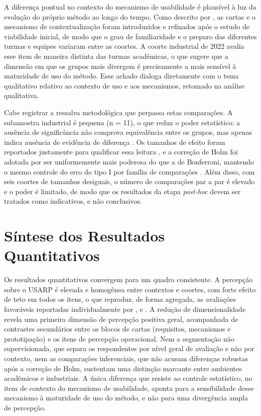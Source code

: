 \FloatBarrier

A diferença pontual no contexto do mecanismo de usabilidade é plausível à luz da evolução do próprio método ao longo do tempo. Como descrito por , as cartas e o mecanismo de contextualização foram introduzidos e refinados após o estudo de viabilidade inicial, de modo que o grau de familiaridade e o preparo das diferentes turmas e equipes variaram entre as coortes. A coorte industrial de 2022 avalia esse item de maneira distinta das turmas acadêmicas, o que sugere que a dimensão em que os grupos mais divergem é precisamente a mais sensível à maturidade de uso do método. Esse achado dialoga diretamente com o tema qualitativo relativo ao contexto de uso e aos mecanismos, retomado na análise qualitativa.

Cabe registrar a ressalva metodológica que perpassa estas comparações. A subamostra industrial é pequena (n = 11), o que reduz o poder estatístico: a ausência de significância não comprova equivalência entre os grupos, mas apenas indica ausência de evidência de diferença \cite{field2018}. Os tamanhos de efeito foram reportados justamente para qualificar essa leitura \cite{hair2019}, e a correção de Holm foi adotada por ser uniformemente mais poderosa do que a de Bonferroni, mantendo o mesmo controle do erro do tipo I por família de comparações \cite{holm1979}. Além disso, com seis coortes de tamanhos desiguais, o número de comparações par a par é elevado e o poder é limitado, de modo que os resultados da etapa \textit{post-hoc} devem ser tratados como indicativos, e não conclusivos.

\section{Síntese dos Resultados Quantitativos}
\label{sec:res-sintese}

Os resultados quantitativos convergem para um quadro consistente. A percepção sobre o USARP é elevada e homogênea entre contextos e coortes, com forte efeito de teto em todos os itens, o que reproduz, de forma agregada, as avaliações favoráveis reportadas individualmente por ,  e . A redução de dimensionalidade revela uma primeira dimensão de percepção positiva geral, acompanhada de contrastes secundários entre os blocos de cartas (requisitos, mecanismos e prototipação) e os itens de percepção operacional. Nem a segmentação não supervisionada, que separa os respondentes por nível geral de avaliação e não por contexto, nem as comparações inferenciais, que não acusam diferenças robustas após a correção de Holm, sustentam uma distinção marcante entre ambientes acadêmicos e industriais. A única diferença que resiste ao controle estatístico, no item de contexto do mecanismo de usabilidade, aponta para a sensibilidade desse mecanismo à maturidade de uso do método, e não para uma divergência ampla de percepção.

